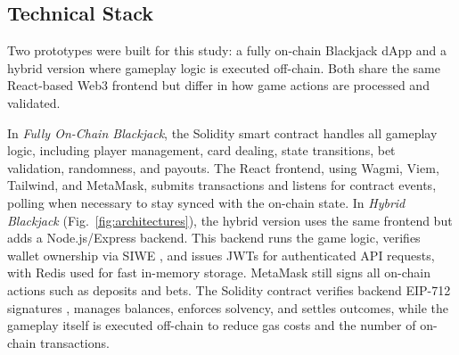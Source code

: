 \documentclass[10pt,conference]{IEEEtran}
\begin{document}
\subsection{Technical Stack}
Two prototypes were built for this study: a fully on-chain Blackjack dApp and a hybrid version where gameplay logic is executed off-chain. Both share the same React-based Web3 frontend but differ in how game actions are processed and validated.

In \textit{Fully On-Chain Blackjack}, the Solidity smart contract handles all gameplay logic, including player management, card dealing, state transitions, bet validation, randomness, and payouts. The React frontend, using Wagmi, Viem, Tailwind, and MetaMask, submits transactions and listens for contract events, polling when necessary to stay synced with the on-chain state.
%
In \textit{Hybrid Blackjack} (Fig.~\ref{fig:architectures}), the hybrid version uses the same frontend but adds a Node.js/Express backend. This backend runs the game logic, verifies wallet ownership via SIWE \cite{EIP4361}, and issues JWTs for authenticated API requests, with Redis used for fast in-memory storage. MetaMask still signs all on-chain actions such as deposits and bets. The Solidity contract verifies backend EIP-712 signatures \cite{EIP712}, manages balances, enforces solvency, and settles outcomes, while the gameplay itself is executed off-chain to reduce gas costs and the number of on-chain transactions.
\end{document}
